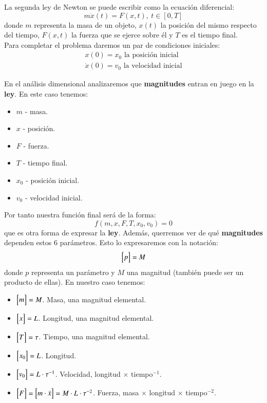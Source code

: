 \begin{eg}\label{eg:1}
    La segunda ley de Newton se puede escribir como la ecuación diferencial:
    $$
        m \ddot x(t) = F(x, t),\ t\in[0, T]
    $$
    donde $m$ representa la masa de un objeto, $x(t)$ la posición del mismo respecto del tiempo, $F(x, t)$ la fuerza que se ejerce sobre él y $T$ es el tiempo final.\\
    Para completar el problema daremos un par de condiciones iniciales:
    \begin{align*}
        x(0) = x_0 \text{ la posición inicial }\\
        \dot x(0) = v_0 \text{ la velocidad inicial}
    \end{align*}

    En el análisis dimensional analizaremos que \textbf{magnitudes} entran en juego en la \textbf{ley}. En este caso tenemos:
    \begin{itemize}
        \item $m$ - masa.
        \item $x$ - posición.
        \item $F$ - fuerza.
        \item $T$ - tiempo final.
        \item $x_0$ - posición inicial.
        \item $v_0$ - velocidad inicial.
    \end{itemize}

    Por tanto nuestra función final será de la forma:
    $$
        f(m, x, F, T, x_0, v_0) = 0
    $$
    que es otra forma de expresar la \textbf{ley}. Además, querremos ver de qué \textbf{magnitudes} dependen estos $6$ parámetros. Esto lo expresaremos con la notación:
    $$
        \mx{p} = M
    $$
    donde $p$ representa un parámetro y $M$ una magnitud (también puede ser un producto de ellas). En nuestro caso tenemos:
    \begin{itemize}
        \item $\mx{m} = M$. Masa, una magnitud elemental.
        \item $\mx{x} = L$. Longitud, una magnitud elemental.
        \item $\mx{T} = \tau$. Tiempo, una magnitud elemental.
        \item $\mx{x_0} = L$. Longitud.
        \item $\mx{v_0} = L \cdot \tau^{-1}$. Velocidad, longitud $\times$ tiempo$^{-1}$.
        \item $\mx{F} = \mx{m \cdot \ddot x} = M \cdot L \cdot \tau^{-2}$. Fuerza, masa $\times$ longitud $\times$ tiempo$^{-2}$.
    \end{itemize}
\end{eg}

